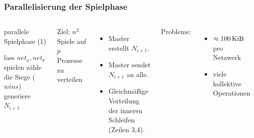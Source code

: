\begin{frame}[t]
    \frametitle{Parallelisierung der Spielphase}

    \begin{columns}[t]
        \vspace{-0.7cm}
        \begin{algorithm}[H]
            \caption{parallele Spielphase (1)}
            \begin{algorithmic}[1]
                            \State lass $net_a, net_b$ spielen
                            \State zähle die Siege ($wins$)
                        \EndParDo
                    \EndParDo
                    \State {}
                        generiere $N_{i+1}$
                    \EndIIf
                    \State {}
                \EndFor
            \end{algorithmic}
        \end{algorithm}
        \hfill

        Ziel: $n^2$ Spiele auf $p$ Prozesse zu verteilen
        \begin{itemize}
            \item Master erstellt $N_{i+1}$.
            \item Master sendet $N_{i+1}$ an alle.
            \item Gleichmäßige Verteilung der inneren Schleifen (Zeilen 3,4).
        \end{itemize}
        \pause
        Probleme:
        \begin{itemize}
            \item $\approx \SI{100}{\kibi\byte}$ pro Netzwerk
            \item viele kollektive Operationen
        \end{itemize}
    \end{columns}
\end{frame}

